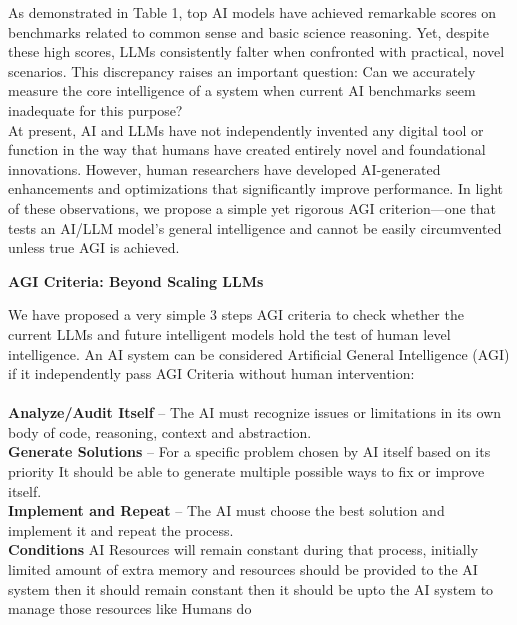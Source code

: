 \documentclass[11pt]{scrartcl}
\begin{document}
As demonstrated in Table 1, top AI models have achieved remarkable scores on benchmarks related to common sense and basic science reasoning. Yet, despite these high scores, LLMs consistently falter when confronted with practical, novel scenarios. This discrepancy raises an important question: Can we accurately measure the core intelligence of a system when current AI benchmarks seem inadequate for this purpose? \\

At present, AI and LLMs have not independently invented any digital tool or function in the way that humans have created entirely novel and foundational innovations. However, human researchers have developed AI-generated enhancements and optimizations that significantly improve performance. In light of these observations, we propose a simple yet rigorous AGI criterion—one that tests an AI/LLM model's general intelligence and cannot be easily circumvented unless true AGI is achieved. \\

\begin{huge}
\textbf{AGI Criteria: Beyond Scaling LLMs}
\end{huge}
We have proposed a very simple 3 steps AGI criteria to check whether the current LLMs and future intelligent models hold the test of human level intelligence. An AI system can be considered Artificial General Intelligence (AGI) if it independently pass AGI Criteria without human intervention: \\ \\
\textbf{Analyze/Audit Itself} – The AI must recognize issues or limitations in its own body of code, reasoning, context and abstraction. \\
\textbf{Generate Solutions} – For a specific problem chosen by AI itself based on its priority It should be able to generate multiple possible ways to fix or improve itself. \\
\textbf{Implement and Repeat} – The AI must choose the best solution and implement it and repeat the process. \\

\textbf{Conditions}
AI Resources will remain constant during that process, initially limited amount of extra memory and resources should be provided to the AI system then it should remain constant then it should be upto the AI system to manage those resources like Humans do \\
\end{document}
